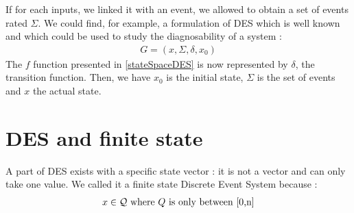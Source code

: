 If for each inputs, we linked it with an event, we allowed to obtain a set of events rated $\Sigma$. We could find, for example, a formulation of DES which is well known and which could be used to study the diagnosability of a system \cite{DiagnostabilityOfDES}: 
\begin{align}\label{ModelSystemSampath}
G = (x, \Sigma, \delta, x_0)
\end{align}
The $f$ function presented in \ref{stateSpaceDES} is now represented by $\delta$, the transition function. Then, we have $x_0$ is the initial state, $\Sigma$ is the set of events and $x$ the actual state. 




\section{DES and finite state}
A part of DES exists with a specific state vector : it is not a vector and can only take one value. We called it a finite state Discrete Event System because : \begin{align*}
x\in \cal{Q} \text{ where $Q$ is only between [0,n]}
\end{align*}



